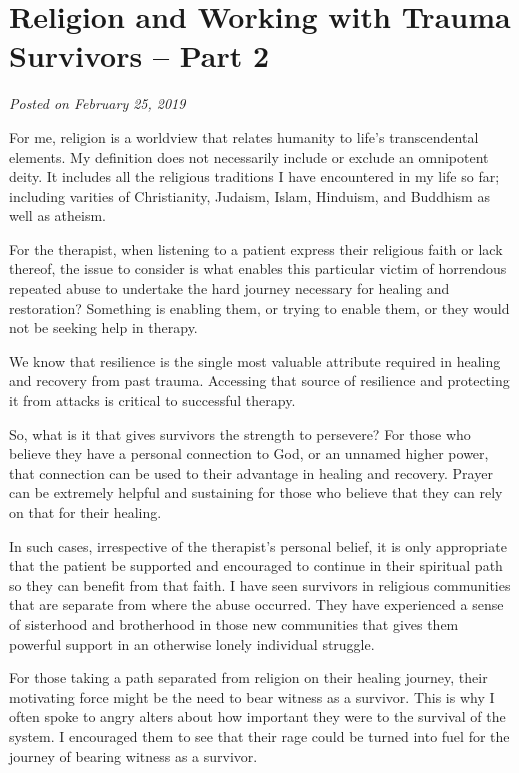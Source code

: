 \documentclass[]{book}
\begin{document}
\hypertarget{religion-and-working-with-trauma-survivors-part-2}{%
\section{Religion and Working with Trauma Survivors -- Part 2}\label{religion-and-working-with-trauma-survivors-part-2}}

\emph{Posted on February 25, 2019}

For me, religion is a worldview that relates humanity to life's transcendental elements. My definition does not necessarily include or exclude an omnipotent deity. It includes all the religious traditions I have encountered in my life so far; including varities of Christianity, Judaism, Islam, Hinduism, and Buddhism as well as atheism.

For the therapist, when listening to a patient express their religious faith or lack thereof, the issue to consider is what enables this particular victim of horrendous repeated abuse to undertake the hard journey necessary for healing and restoration? Something is enabling them, or trying to enable them, or they would not be seeking help in therapy.

We know that resilience is the single most valuable attribute required in healing and recovery from past trauma. Accessing that source of resilience and protecting it from attacks is critical to successful therapy.

So, what is it that gives survivors the strength to persevere? For those who believe they have a personal connection to God, or an unnamed higher power, that connection can be used to their advantage in healing and recovery. Prayer can be extremely helpful and sustaining for those who believe that they can rely on that for their healing.

In such cases, irrespective of the therapist's personal belief, it is only appropriate that the patient be supported and encouraged to continue in their spiritual path so they can benefit from that faith. I have seen survivors in religious communities that are separate from where the abuse occurred. They have experienced a sense of sisterhood and brotherhood in those new communities that gives them powerful support in an otherwise lonely individual struggle.

For those taking a path separated from religion on their healing journey, their motivating force might be the need to bear witness as a survivor. This is why I often spoke to angry alters about how important they were to the survival of the system. I encouraged them to see that their rage could be turned into fuel for the journey of bearing witness as a survivor.
\end{document}

